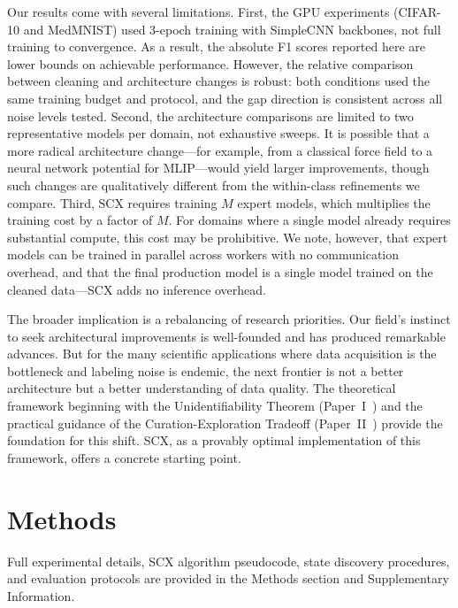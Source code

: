 \documentclass[12pt,a4paper]{article}
\newenvironment{methods}{\section*{Methods}}{}
\begin{document}
Our results come with several limitations. First, the GPU experiments (CIFAR-10 and MedMNIST) used 3-epoch training with SimpleCNN backbones, not full training to convergence. As a result, the absolute F1 scores reported here are lower bounds on achievable performance. However, the relative comparison between cleaning and architecture changes is robust: both conditions used the same training budget and protocol, and the gap direction is consistent across all noise levels tested. Second, the architecture comparisons are limited to two representative models per domain, not exhaustive sweeps. It is possible that a more radical architecture change---for example, from a classical force field to a neural network potential for MLIP---would yield larger improvements, though such changes are qualitatively different from the within-class refinements we compare. Third, SCX requires training $M$ expert models, which multiplies the training cost by a factor of $M$. For domains where a single model already requires substantial compute, this cost may be prohibitive. We note, however, that expert models can be trained in parallel across workers with no communication overhead, and that the final production model is a single model trained on the cleaned data---SCX adds no inference overhead.

The broader implication is a rebalancing of research priorities. Our field's instinct to seek architectural improvements is well-founded and has produced remarkable advances. But for the many scientific applications where data acquisition is the bottleneck and labeling noise is endemic, the next frontier is not a better architecture but a better understanding of data quality. The theoretical framework beginning with the Unidentifiability Theorem (Paper~I~\cite{xi2025fundamental}) and the practical guidance of the Curation-Exploration Tradeoff (Paper~II~\cite{scx2025curation}) provide the foundation for this shift. SCX, as a provably optimal implementation of this framework, offers a concrete starting point.

\begin{methods}
Full experimental details, SCX algorithm pseudocode, state discovery procedures, and evaluation protocols are provided in the Methods section and Supplementary Information.
\end{methods}

\begin{flushleft}
\end{flushleft}
\end{document}
